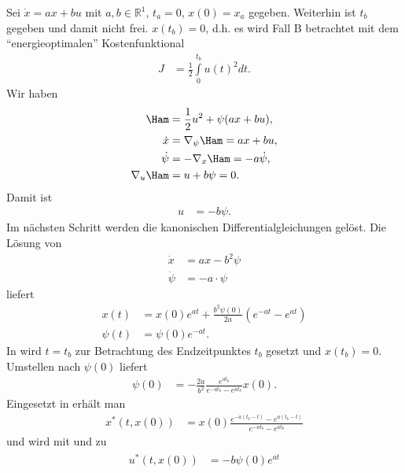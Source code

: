 \begin{exmp}\label{exmp:kap_2_vor_optlsg_1}
Sei $\dot{x}=ax+bu$ mit $a,b\in\mathbb{R}^1$, $t_a=0$, $x(0)=x_a$ gegeben. Weiterhin ist $t_b$ gegeben und damit nicht frei. $x(t_b)=0$, d.h. es
wird Fall B betrachtet mit dem "`energieoptimalen"' Kostenfunktional 
\begin{align*}
	J & = \frac12\int\limits_0^{t_b}u(t)^2dt.
\end{align*}
Wir haben
\begin{align*}
	\Ham & = \frac12 u^2 + \psi(ax+bu),\\
	\dot{x} & = \nabla_{\psi}\Ham = ax+bu,\\
	\dot{\psi} & = -\nabla_x\Ham = -a\dot \psi,\\
	\nabla_u\Ham & = u+b\psi = 0.
\end{align*}
Damit ist 
\begin{align}
	u & = -b\psi.	\label{eqn:kap_2_vor_optlsg_u}
\end{align}
Im nächsten Schritt werden die kanonischen Differentialgleichungen gelöst. Die Lösung von 
\begin{align*}
	\dot{x} & = ax - b^2\psi\\
	\dot{\psi} & = -a\cdot\psi
\end{align*}
liefert
\begin{align}
	x(t) & = x(0)e^{at}+\frac{b^2\psi(0)}{2a}\left(e^{-at}-e^{at} \right)	\label{eqn:kap_2_vor_optlsg_x}\\
	\psi(t) & = \psi(0)e^{-at}.		\label{eqn:kap_2_vor_optlsg_psi}
\end{align}
In  wird $t=t_b$ zur Betrachtung des Endzeitpunktes $t_b$ gesetzt und $x(t_b)= 0$. Umstellen nach $\psi(0)$ liefert
\begin{align}
	\psi(0) & = -\frac{2a}{b^2}\frac{e^{at_b}}{e^{-at_b}-e^{at_b}}x(0).	\label{eqn:kap_2_vor_optlsg_psi0}
\end{align}
Eingesetzt in  erhält man
\begin{align}
	x^{\ast}(t,x(0)) & = x(0)\frac{e^{-a(t_b-t)}-e^{a(t_b-t)}}{e^{-at_b}-e^{at_b}}	\label{eqn:kap_2_vor_optlsg_xast}
\end{align}
und  wird mit  und  zu
\begin{align}
\begin{split}\label{eqn:kap_2_vor_optlsg_uast}
	u^{\ast}(t,x(0)) & = -b\psi(0)e^{at}\\

\end{split}
\end{align}
\end{exmp}

